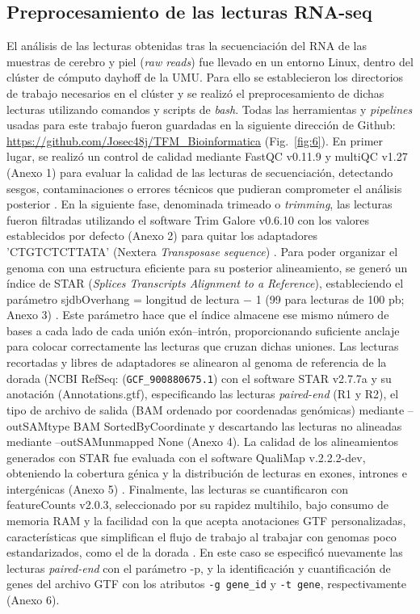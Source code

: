 \documentclass[10pt,a4paper]{article}
\begin{document}
\subsection{Preprocesamiento de las lecturas RNA-seq}  
El análisis de las lecturas obtenidas tras la secuenciación del RNA de las muestras de cerebro y piel (\textit{raw reads}) fue llevado en un entorno Linux, dentro del clúster de cómputo dayhoff de la UMU. Para ello se establecieron los directorios de trabajo necesarios en el clúster y se realizó el preprocesamiento de dichas lecturas utilizando comandos y scripts de \textit{bash}. Todas las herramientas y  \textit{pipelines} usadas para este trabajo fueron guardadas en la siguiente dirección de Github: \url{https://github.com/Josec48j/TFM_Bioinformatica} (Fig.~\ref{fig:6}). En primer lugar, se realizó un control de calidad mediante FastQC v0.11.9 y multiQC v1.27 (Anexo 1) para evaluar la calidad de las lecturas de secuenciación, detectando sesgos, contaminaciones o errores técnicos que pudieran comprometer el análisis posterior \parencite{Andrews2010}. En la siguiente fase, denominada trimeado o \textit{trimming}, las lecturas fueron filtradas utilizando el software Trim Galore v0.6.10 con los valores establecidos por defecto (Anexo 2) para quitar los adaptadores 'CTGTCTCTTATA' (Nextera \textit{Transposase sequence}) \parencite{Krueger2015}. Para poder organizar el genoma con una estructura eficiente para su posterior alineamiento, se generó un índice de STAR (\textit{Splices Transcripts Alignment to a Reference}), estableciendo el parámetro sjdbOverhang = longitud de lectura − 1 (99 para lecturas de 100 pb; Anexo 3) \parencite{Dobin2013}. Este parámetro hace que el índice almacene ese mismo número de bases a cada lado de cada unión exón–intrón, proporcionando suficiente anclaje para colocar correctamente las lecturas que cruzan dichas uniones. Las lecturas recortadas y libres de adaptadores se alinearon al genoma de referencia de la dorada (NCBI RefSeq: (\texttt{GCF\_900880675.1}) con el software STAR v2.7.7a y su anotación (Annotations.gtf), especificando las lecturas \textit{paired-end} (R1 y R2), el tipo de archivo de salida (BAM ordenado por coordenadas genómicas) mediante --outSAMtype BAM SortedByCoordinate y descartando las lecturas no alineadas mediante --outSAMunmapped None (Anexo 4). La calidad de los alineamientos generados con STAR fue evaluada con el software QualiMap v.2.2.2-dev, obteniendo la cobertura génica y la distribución de lecturas en exones, intrones e intergénicas (Anexo 5)  \parencite{GarciaAlcalde2012}. Finalmente, las lecturas se cuantificaron con featureCounts v2.0.3, seleccionado por su rapidez multihilo, bajo consumo de memoria RAM y la facilidad con la que acepta anotaciones GTF personalizadas, características que simplifican el flujo de trabajo al trabajar con genomas poco estandarizados, como el de la dorada \parencite{Liao2014}. En este caso se especificó nuevamente las lecturas \textit{paired-end} con el parámetro -p, y la identificación y cuantificación de genes del archivo GTF con los atributos \texttt{-g gene\_id} y \texttt{-t gene}, respectivamente (Anexo 6).
\end{document}
